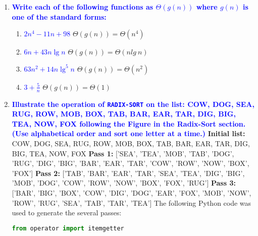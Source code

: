 \documentclass{article}
\begin{document}
\begin{enumerate}
\item \textbf{\textcolor{blue}{Write each of the following functions as $\Theta(g(n))$ where
$g(n)$ is one of the standard forms:}}
    \begin{enumerate}
    \item \textbf{\textcolor{blue}{$2n^4-11n+98$}}
        \newline\newline $\Theta(g(n)) = \Theta(n^4)$
    \item \textbf{\textcolor{blue}{$6n + 43n\lg n$}}
        \newline\newline$\Theta(g(n)) = \Theta(nlg\ n)$\newline
    \item \textbf{\textcolor{blue}{$63n^2 + 14n\lg^5n$}}
        \newline\newline$\Theta(g(n)) = \Theta(n^2)$\newline
    \item \textbf{\textcolor{blue}{$3 + \frac{5}{n}$}}
        \newline\newline$\Theta(g(n)) = \Theta(1)$\newline
    \end{enumerate}

\item \textbf{\textcolor{blue}{Illustrate the operation of {\tt RADIX-SORT} on the
list: COW, DOG, SEA, RUG, ROW, MOB, BOX, TAB, BAR, EAR, TAR, DIG, BIG,
TEA, NOW, FOX following the Figure in the Radix-Sort section.
(Use alphabetical order and sort one letter at a time.)}}
    \newline\newline\textbf{Initial list:} COW, DOG, SEA, RUG, ROW, MOB, BOX, TAB, BAR, EAR, TAR, DIG, BIG, TEA, NOW, FOX
    \newline\textbf{Pass 1:} ['SEA', 'TEA', 'MOB', 'TAB', 'DOG', 'RUG', 'DIG', 'BIG', 'BAR', 'EAR', 'TAR', 'COW', 'ROW', 'NOW', 'BOX', 'FOX']
    \newline\textbf{Pass 2:} ['TAB', 'BAR', 'EAR', 'TAR', 'SEA', 'TEA', 'DIG', 'BIG', 'MOB', 'DOG', 'COW', 'ROW', 'NOW', 'BOX', 'FOX', 'RUG']
    \newline\textbf{Pass 3:} ['BAR', 'BIG', 'BOX', 'COW', 'DIG', 'DOG', 'EAR', 'FOX', 'MOB', 'NOW', 'ROW', 'RUG', 'SEA', 'TAB', 'TAR', 'TEA']
    \newline\newline The following Python code was used to generate the several passes:
    \begin{lstlisting}[language=Python]
    from operator import itemgetter
                 

\end{lstlisting}
\end{enumerate}
\end{document}
